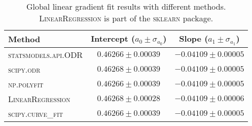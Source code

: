 
\begin{table}
\caption{Global linear gradient fit results with different methods. \textsc{LinearRegression} is part of the \textsc{sklearn} package.}
\label{tab:global_fit_results_per_method}
\begin{tabularx}{\columnwidth}{lCC}
\hline
Method & Intercept ($a_0 \pm \sigma_{a_0}$) & Slope ($a_1 \pm \sigma_{a_1}$) \\
\hline
\textsc{statsmodels.api.ODR} & $0.46266 \pm 0.00039$ & $-0.04109 \pm 0.00005$ \\
\textsc{scipy.odr} & $0.46268 \pm 0.00039$ & $-0.04109 \pm 0.00005$ \\
\textsc{np.polyfit} & $0.46266 \pm 0.00039$ & $-0.04109 \pm 0.00005$ \\
\textsc{LinearRegression} & $0.46268 \pm 0.00028$ & $-0.04109 \pm 0.00006$ \\
\textsc{scipy.curve\_fit} & $0.46266 \pm 0.00039$ & $-0.04109 \pm 0.00005$ \\
\hline
\end{tabularx}
\end{table}
